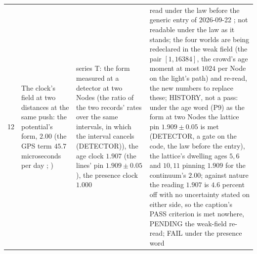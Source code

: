 {\begin{longtable}{L{0.3in}L{2.0in}L{1.5in}L{2.2in}}
12 & The clock's field at two distances at the same push: the potential's form, $2.00$ (the GPS term $45.7$ microseconds per day \cite{ashby2003}; \cite{pound1960,delva2018}) & series T: the form measured at a detector at two Nodes (the ratio of the two records' rates over the same intervals, in which the interval cancels (DETECTOR)), the age clock $1.907$ (the lines' pin $1.909 \pm 0.05$), the presence clock $1.000$ & read under the law before the generic entry of 2026-09-22 \cite{genericentry}; not readable under the law as it stands; the four worlds are being redeclared in the weak field (the pair $[1, 16384]$, the crowd's age moment at most $1024$ per Node on the light's path) and re-read, the new numbers to replace these; HISTORY, not a pass: under the age word (P9) as the form at two Nodes the lattice pin $1.909 \pm 0.05$ is met (DETECTOR, a gate on the code, the law before the entry), the lattice's dwelling ages $5, 6$ and $10, 11$ pinning $1.909$ for the continuum's $2.00$; against nature the reading $1.907$ is $4.6$ percent off with no uncertainty stated on either side, so the caption's PASS criterion is met nowhere, PENDING the weak-field re-read; FAIL under the presence word \\

\end{longtable}}
